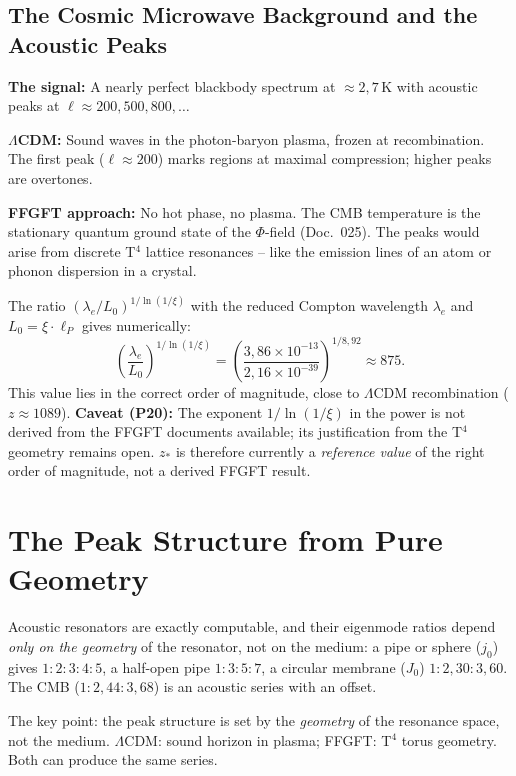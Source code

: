 \subsection{The Cosmic Microwave Background and the Acoustic Peaks}

\textbf{The signal:} A nearly perfect blackbody spectrum at $\approx 2{,}7$\,K
with acoustic peaks at $\ell \approx 200, 500, 800, \ldots$

\textbf{$\Lambda$CDM:} Sound waves in the photon-baryon plasma, frozen at
recombination. The first peak ($\ell \approx 200$) marks regions at maximal
compression; higher peaks are overtones.

\textbf{FFGFT approach:} No hot phase, no plasma. The CMB temperature is the
stationary quantum ground state of the $\Phi$-field (Doc.~025). The peaks
would arise from discrete T$^4$ lattice resonances -- like the emission
lines of an atom or phonon dispersion in a crystal.

The ratio $(\lambda_e/L_0)^{1/\ln(1/\xi)}$ with the reduced Compton
wavelength $\lambda_e$ and $L_0 = \xi\cdot\ell_P$ gives numerically:
\[
  \left(\frac{\lambda_e}{L_0}\right)^{1/\ln(1/\xi)}
  = \left(\frac{3{,}86\times10^{-13}}{2{,}16\times10^{-39}}\right)^{1/8{,}92}
  \approx 875.
\]
This value lies in the correct order of magnitude, close to $\Lambda$CDM
recombination ($z \approx 1089$). \textbf{Caveat (P20):} The exponent
$1/\ln(1/\xi)$ in the power is not derived from the FFGFT documents
available; its justification from the T$^4$ geometry remains open.
$z_*$ is therefore currently a \emph{reference value} of the right order
of magnitude, not a derived FFGFT result.

\section{The Peak Structure from Pure Geometry}

Acoustic resonators are exactly computable, and their eigenmode ratios
depend \emph{only on the geometry} of the resonator, not on the medium:
a pipe or sphere ($j_0$) gives $1:2:3:4:5$, a half-open pipe $1:3:5:7$,
a circular membrane ($J_0$) $1:2{,}30:3{,}60$. The CMB ($1:2{,}44:3{,}68$)
is an acoustic series with an offset.

The key point: the peak structure is set by the \emph{geometry} of the
resonance space, not the medium. $\Lambda$CDM: sound horizon in plasma;
FFGFT: T$^4$ torus geometry. Both can produce the same series.

